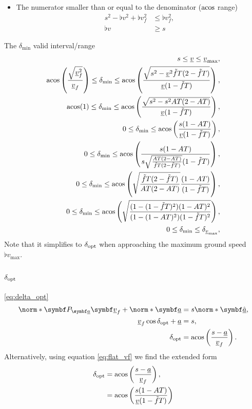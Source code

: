 \begin{itemize}
\item
The numerator smaller than or equal to the denominator ($\operatorname{acos}$ range)
\begin{align*}
s^2 - \flat{v}^2 + \flat{v}_f^2 &\le \flat{v}_f^2,\\
\flat{v} &\ge s
\end{align*}
\end{itemize}


The $\delta_{\min}$ valid interval/range
\begin{align*}
s \le \flat{v} \le \flat{v}_{\max},\\
\acos\left(\frac{\sqrt{\flat{v}_f^2}}{\flat{v}_f} \right) \le \delta_{\min} \le \acos\left(\frac{\sqrt{s^2 - \flat{v}^2\tilde{f}T(2 - \tilde{f}T)}}{\flat{v}(1 - \tilde{f}T)}\right),\\
\acos(1) \le \delta_{\min} \le \acos\left(\frac{\sqrt{s^2 - s^2 AT(2 - AT)}}{\flat{v}(1 - \tilde{f}T)}\right),\\
0 \le \delta_{\min} \le \acos\left(\frac{s(1 - AT)}{\flat{v}(1 - \tilde{f}T)}\right),\\
0 \le \delta_{\min} \le \acos\left(\frac{s(1 - AT)}{s\sqrt{\frac{AT(2 - AT)}{\tilde{f}T(2 - \tilde{f}T)}} (1 - \tilde{f}T)}\right),\\
0 \le \delta_{\min} \le \acos\left(\sqrt{\frac{\tilde{f}T(2 - \tilde{f}T)}{AT(2 - AT)}} \frac{(1 - AT)}{(1 - \tilde{f}T)}\right),\\
0 \le \delta_{\min} \le \acos\left(\sqrt{\frac{(1 - (1 - \tilde{f}T)^2) (1 - AT)^2}{(1 - (1 - AT)^2) (1 - \tilde{f}T)^2}}\right),\\
0 \le \delta_{\min} \le \delta_{\flat{v}_{\max}},\\
\end{align*}
Note that it simplifies to $\delta_{\operatorname{opt}}$ when approaching the maximum ground speed $\flat{v}_{\max}$.


\subsection{\texorpdfstring{$\delta_{\operatorname{opt}}$}{delta\_opt}}
\label{app:derive_delta_opt}
\eqref{eq:delta_opt}
\begin{align*}
\norm*{\projmat{\flat{a}} \vec{\flat{v}}_f} + \norm*{\vec{\flat{a}}} &= s \norm*{\uvec{\flat{a}}},\\
\flat{v}_f \cos\delta_{\opt} + \flat{a} &= s,\\
\delta_{\opt} &= \acos\left( \frac{s - \flat{a}}{\flat{v}_f} \right).
\end{align*}
Alternatively, using equation \eqref{eq:flat_vf} we find the extended form
\begin{align*}
\delta_{\opt} &= \acos\left( \frac{s - \flat{a}}{\flat{v}_f} \right),\\
&= \acos\left( \frac{s(1 - AT)}{\flat{v}(1 - \tilde{f}T)} \right)
\end{align*}

